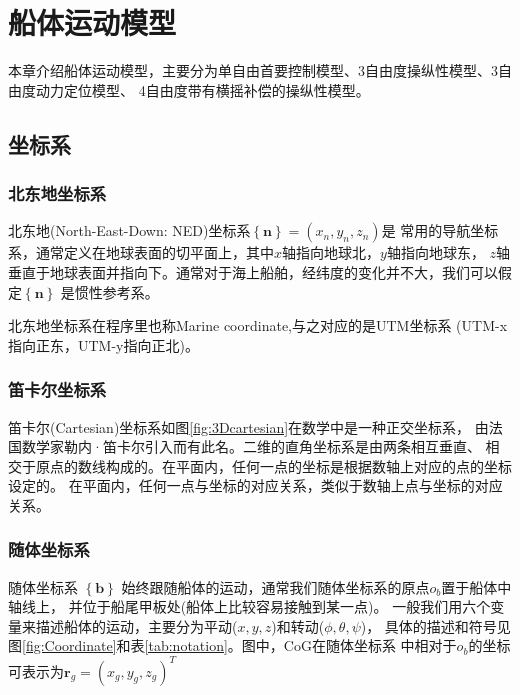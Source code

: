 

\newcommand{\bodyframe}{\left\{ \mathbf{b} \right\}}
\newcommand{\NEDframe}{\left\{ \mathbf{n} \right\} }

\chapter{船体运动模型}
\label{chap:chapter01}

本章介绍船体运动模型，主要分为单自由首要控制模型、3自由度操纵性模型、3自由度动力定位模型、
4自由度带有横摇补偿的操纵性模型。

\section{坐标系}
\subsection{北东地坐标系}
北东地(North-East-Down: NED)坐标系$\NEDframe=(x_n, y_n, z_n)$是
常用的导航坐标系，通常定义在地球表面的切平面上，其中$x$轴指向地球北，$y$轴指向地球东，
$z$轴垂直于地球表面并指向下。通常对于海上船舶，经纬度的变化并不大，我们可以假定$\NEDframe$
是惯性参考系。

北东地坐标系在程序里也称Marine coordinate,与之对应的是UTM坐标系
(UTM-x指向正东，UTM-y指向正北)。

\subsection{笛卡尔坐标系}
笛卡尔(Cartesian)坐标系如图\ref{fig:3Dcartesian}在数学中是一种正交坐标系，
由法国数学家勒内·笛卡尔引入而有此名。二维的直角坐标系是由两条相互垂直、
相交于原点的数线构成的。在平面内，任何一点的坐标是根据数轴上对应的点的坐标设定的。
在平面内，任何一点与坐标的对应关系，类似于数轴上点与坐标的对应关系。

\subsection{随体坐标系}
随体坐标系 $\bodyframe$ 始终跟随船体的运动，通常我们随体坐标系的原点$o_b$置于船体中轴线上，
并位于船尾甲板处(船体上比较容易接触到某一点)。
一般我们用六个变量来描述船体的运动，主要分为平动($x,y,z$)和转动($\phi, \theta, \psi$)，
具体的描述和符号见图\ref{fig:Coordinate}和表\ref{tab:notation}。图中，CoG在随体坐标系
中相对于$o_b$的坐标可表示为$\mathbf{r}_g = (x_g,y_g, z_g)^T$

